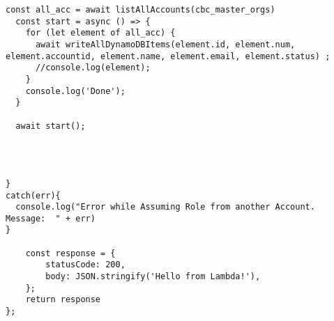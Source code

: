 \begin{lstlisting}[caption={Lambda-Code in NodeJS},
label=lst:LambdaCode,basicstyle=\ttfamily\small ]
  const all_acc = await listAllAccounts(cbc_master_orgs)
  const start = async () => {
    for (let element of all_acc) {
      await writeAllDynamoDBItems(element.id, element.num, element.accountid, element.name, element.email, element.status) ;
      //console.log(element);
    }
    console.log('Done');
  }

  await start();




}
catch(err){
  console.log("Error while Assuming Role from another Account. Message:  " + err)
}

    const response = {
        statusCode: 200,
        body: JSON.stringify('Hello from Lambda!'),
    };
    return response
};

\end{lstlisting}
